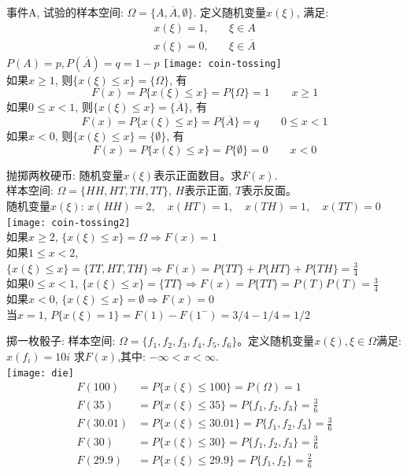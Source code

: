 \begin{frame}[shrink]
事件A, 试验的样本空间: $\Omega=\{A,\overline{A},\emptyset \}$. 定义随机变量$x(\xi)$,
满足:
\begin{align*}
	x(\xi)=1, &\quad \xi\in A\\
	x(\xi)=0, &\quad \xi\in\overline{A}
\end{align*}
$P(A)=p,P(\overline{A})=q=1-p$
\texttt{[image: coin-tossing]}\\
如果$x\ge 1$, 则$\{x(\xi)\le x\}=\{\Omega \}$, 有
\[F(x)=P\{x(\xi)\le x \}=P\{\Omega \}=1\qquad x\ge 1 \] 
如果$0\le x<1$, 则$\{x(\xi)\le x\}=\{\overline{A}\}$, 有
\[F(x)=P\{x(\xi)\le x \}=P\{\overline{A}\}=q \qquad 0\le x<1 \] 
如果$x<0$, 则$\{x(\xi)\le x\}=\{\emptyset\}$, 有
\[F(x)=P\{x(\xi)\le x \}=P\{\emptyset\}=0 \qquad x<0 \] 
\end{frame}

\begin{frame}[shrink]
抛掷两枚硬币: 随机变量$x(\xi)$表示正面数目。求$F(x)$.\\
样本空间: $\Omega=\{HH,HT,TH,TT\}$, $H$表示正面, $T$表示反面。\\
随机变量$x(\xi)$: $x(HH)=2,\quad x(HT)=1, \quad x(TH)=1, \quad x(TT)=0$
\texttt{[image: coin-tossing2]}\\
如果$x\ge 2$, $\{x(\xi)\le x\}=\Omega \Rightarrow F(x)=1$ \\
如果$1\le x<2$, $\{x(\xi)\le x\}=\{TT,HT,TH\} \Rightarrow F(x)=P\{TT\}+P\{HT\}+P\{TH\}=\frac{3}{4}$ \\
如果$0\le x<1$, $\{x(\xi)\le x\}=\{TT\} \Rightarrow F(x)=P\{TT\}=P(T)P(T)=\frac{3}{4}$ \\
如果$x<0$, $\{x(\xi)\le x \}=\emptyset \Rightarrow F(x)=0$ \\
当$x=1$, $P\{x(\xi)=1\}=F(1)-F(1^{-})=3/4-1/4=1/2$
\end{frame}

\begin{frame}[shrink]
掷一枚骰子: 样本空间: $\Omega=\{f_1,f_2,f_3,f_4,f_5,f_6\}$。定义随机变量$x(\xi),\xi\in \Omega$满足:$x(f_i)=10i$
求$F(x)$,其中: $-\infty<x<\infty$.\\
\texttt{[image: die]}
\begin{align*}
F(100)&=P\{x(\xi)\le 100 \}=P(\Omega)=1\\
F(35)&=P\{x(\xi)\le 35 \}=P\{f_1,f_2,f_3 \}=\frac{3}{6} \\
F(30.01)&=P\{x(\xi)\le 30.01 \}=P\{f_1,f_2,f_3 \}=\frac{3}{6} \\
F(30)&=P\{x(\xi)\le 30 \}=P\{f_1,f_2,f_3 \}=\frac{3}{6} \\
F(29.9)&=P\{x(\xi)\le 29.9 \}=P\{f_1,f_2 \}=\frac{2}{6} \\
\end{align*}
\end{frame}

